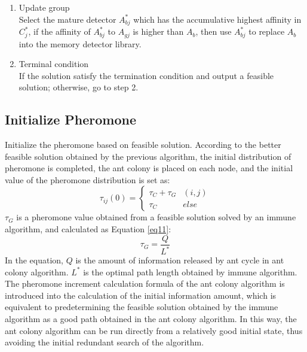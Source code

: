 \documentclass[11pt,a4paper,oldfontcommands]{memoir}
\begin{document}
\begin{enumerate}
\item {Update group} \\
Select the mature detector $A_{bj}^*$ which has the accumulative highest affinity in $C_{j}^*$, if the affinity of $A_{bj}^*$ to $A_{gj}$ is higher than $A_{b}$, then use $A_{bj}^*$ to replace $A_{b}$ into the memory detector library.

\item{Terminal condition} \\
If the solution satisfy the termination condition and output a feasible solution; otherwise, go to step 2.

\end{enumerate}

\subsection{Initialize Pheromone}
Initialize the pheromone based on feasible solution.
According to the better feasible solution obtained by the previous algorithm, the initial distribution of pheromone is completed, the ant colony is placed on each node, and the initial value of the pheromone distribution is set as:
\begin{equation}
\tau_{ij}(0)=
\begin{cases}
\tau_C +\tau_G & (i,j)\\
\tau_C & else
\end{cases}
\tag{10}
\end{equation}
$\tau_G$ is a pheromone value obtained from a feasible solution solved by an immune algorithm, and calculated as Equation \ref {eq11}:
\begin{equation}
\tau_G = \frac{Q}{L^*}
\tag{11} \label {eq11}
\end{equation}
In the equation, $Q$ is the amount of information released by ant cycle in ant colony algorithm. $L^{*}$ is the optimal path length obtained by immune algorithm. The pheromone increment calculation formula of the ant colony algorithm is introduced into the calculation of the initial information amount, which is equivalent to predetermining the feasible solution obtained by the immune algorithm as a good path obtained in the ant colony algorithm. In this way, the ant colony algorithm can be run directly from a relatively good initial state, thus avoiding the initial redundant search of the algorithm.
\end{document}
